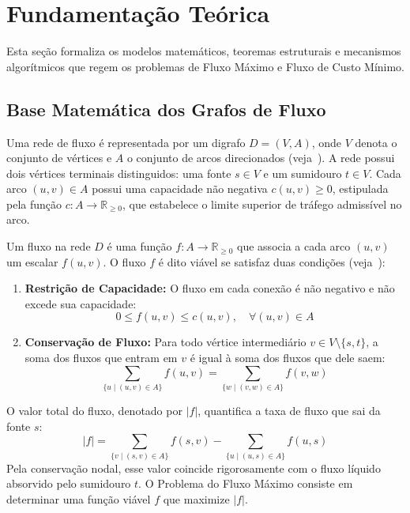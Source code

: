 \documentclass[12pt,a4paper]{article}
\newcounter{teorema}
\begin{document}
\section{Fundamentação Teórica}\label{sec:fundamentacao}

Esta seção formaliza os modelos matemáticos, teoremas estruturais e mecanismos algorítmicos que regem os problemas de Fluxo Máximo e Fluxo de Custo Mínimo.

\subsection{Base Matemática dos Grafos de Fluxo}

Uma rede de fluxo é representada por um digrafo $D = (V, A)$, onde $V$ denota o conjunto de vértices e $A$ o conjunto de arcos direcionados (veja~\cite{ahuja1993network, bondy2008graph}). A rede possui dois vértices terminais distinguidos: uma fonte $s \in V$ e um sumidouro $t \in V$. Cada arco $(u, v) \in A$ possui uma capacidade não negativa $c(u, v) \ge 0$, estipulada pela função $c: A \to \mathbb{R}_{\ge 0}$, que estabelece o limite superior de tráfego admissível no arco.

Um fluxo na rede $D$ é uma função $f: A \to \mathbb{R}_{\ge 0}$ que associa a cada arco $(u, v)$ um escalar $f(u, v)$. O fluxo $f$ é dito viável se satisfaz duas condições  (veja~\cite{ford1956maximal, cook1998combinatorial}):
\begin{enumerate}
    \item \textbf{Restrição de Capacidade:} O fluxo em cada conexão é não negativo e não excede sua capacidade:
    \begin{equation}
        0 \le f(u, v) \le c(u, v), \quad \forall (u, v) \in A
    \end{equation}
    \item \textbf{Conservação de Fluxo:} Para todo vértice intermediário $v \in V \setminus \{s, t\}$, a soma dos fluxos que entram em $v$ é igual à soma dos fluxos que dele saem:
    \begin{equation}
        \sum_{\{u \mid (u, v) \in A\}} f(u, v) = \sum_{\{w \mid (v, w) \in A\}} f(v, w)
    \end{equation}
\end{enumerate}

O valor total do fluxo, denotado por $|f|$, quantifica a taxa de fluxo que sai da fonte $s$:
\begin{equation}
    |f| = \sum_{\{v \mid (s, v) \in A\}} f(s, v) - \sum_{\{u \mid (u, s) \in A\}} f(u, s)
\end{equation}
Pela conservação nodal, esse valor coincide rigorosamente com o fluxo líquido absorvido pelo sumidouro $t$. O Problema do Fluxo Máximo consiste em determinar uma função viável $f$ que maximize $|f|$.
\end{document}
